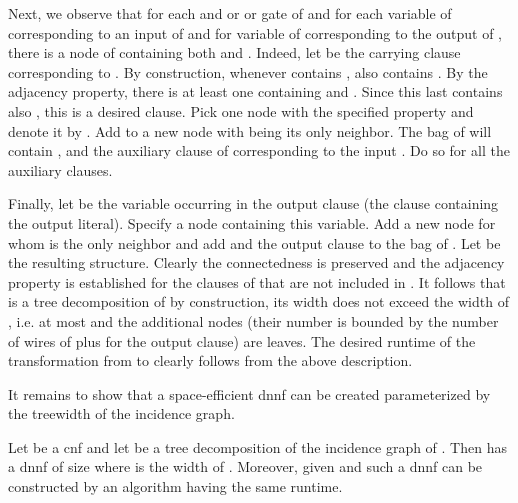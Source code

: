 \documentclass{llncs}
\begin{document}
Next, we observe that for each {\sc and} or {\sc or} gate  of  and for each variable  of  corresponding to an input
of  and for variable  of  corresponding to the output of , there is a node  of 
containing both  and . Indeed, let  be the carrying clause corresponding to . By construction, whenever
 contains ,  also contains . By the adjacency property, there is at least one  containing  and .
Since this last  contains also , this is a desired clause. Pick one node with the specified property and denote
it by . Add to  a new node  with  being its only neighbor. The bag of  will contain
, and  the auxiliary clause of  corresponding to the input . Do so for all the auxiliary clauses. 
\begin{comment}
Finally, properly add a node whose bag contains the variable  of the output literal and the singleton clause containing
this literal (the neighbor of this new node should be an existing node containing ). 
Let  be the resulting structure. It is not hard to observe by construction that 
 satisfies the statement of the lemma.
\end{comment}
Finally, let  be the variable occurring in the output clause (the clause containing the 
output literal). Specify a node  containing this variable.
Add a new node  for whom  is the only neighbor and add  and the output clause to the bag of . 
Let  be the resulting structure. Clearly the connectedness is preserved and the adjacency property
is established for the clauses of  that are not included in . It follows that  is a tree
decomposition of  by construction, its width does not exceed the width of , i.e. at most
 and the additional  nodes (their number is bounded by the number of wires of  plus  for
the output clause) are leaves. The desired runtime of the transformation from  to
 clearly follows from the above description. 


It remains to show that a space-efficient {\sc dnnf} can be created parameterized by the treewidth of the incidence
graph. 

\begin{theorem} \label{dnnfcnf}
Let  be a {\sc cnf} and let  be a tree decomposition of the incidence graph of .
Then  has a {\sc dnnf} of size  where  is the width of .
Moreover, given  and  such a {\sc dnnf} can be constructed by an algorithm having the same runtime. 
\end{theorem}
\end{document}
